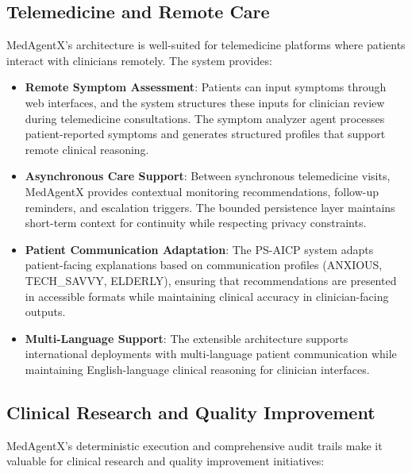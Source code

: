 \documentclass[journal]{IEEEtran}
\begin{document}
\subsection{Telemedicine and Remote Care}

MedAgentX's architecture is well-suited for telemedicine platforms where patients interact with clinicians remotely. The system provides:

\begin{itemize}
    \item \textbf{Remote Symptom Assessment}: Patients can input symptoms through web interfaces, and the system structures these inputs for clinician review during telemedicine consultations. The symptom analyzer agent processes patient-reported symptoms and generates structured profiles that support remote clinical reasoning.
    \item \textbf{Asynchronous Care Support}: Between synchronous telemedicine visits, MedAgentX provides contextual monitoring recommendations, follow-up reminders, and escalation triggers. The bounded persistence layer maintains short-term context for continuity while respecting privacy constraints.
    \item \textbf{Patient Communication Adaptation}: The PS-AICP system adapts patient-facing explanations based on communication profiles (ANXIOUS, TECH\_SAVVY, ELDERLY), ensuring that recommendations are presented in accessible formats while maintaining clinical accuracy in clinician-facing outputs.
    \item \textbf{Multi-Language Support}: The extensible architecture supports international deployments with multi-language patient communication while maintaining English-language clinical reasoning for clinician interfaces.
\end{itemize}

\subsection{Clinical Research and Quality Improvement}

MedAgentX's deterministic execution and comprehensive audit trails make it valuable for clinical research and quality improvement initiatives:
\end{document}
